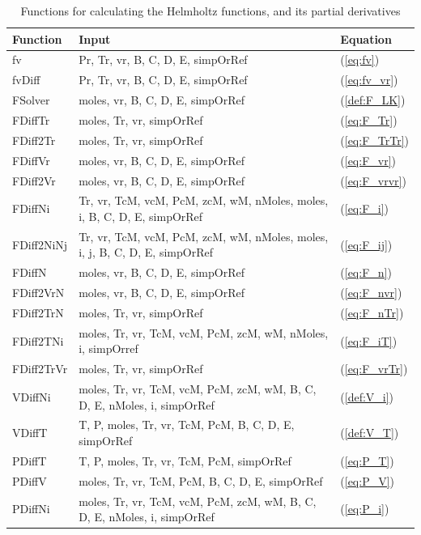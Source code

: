 \documentclass[english]{../thermomemo/thermomemo}
\numberwithin{equation}{section}
\newcommand*{\reff}[1]{(\ref{#1})}
\begin{document}
\begin{table}[t]
\begin{center}
\caption{Functions for calculating the Helmholtz functions, and its partial derivatives}
\label{tab:functionsF}
\begin{tabular}{l p{10cm} l}
\hline%
Function 	& Input   & Equation \\
\hline
fv			& Pr, Tr, vr, B, C, D, E, simpOrRef & \reff{eq:fv} \\
fvDiff		& Pr, Tr, vr, B, C, D, E, simpOrRef & \reff{eq:fv_vr} \\
FSolver		& moles, vr, B, C, D, E, simpOrRef	& \reff{def:F_LK} \\
FDiffTr		& moles, Tr, vr, simpOrRef	& \reff{eq:F_Tr} \\
FDiff2Tr 	& moles, Tr, vr, simpOrRef	& \reff{eq:F_TrTr} \\
FDiffVr		& moles, vr, B, C, D, E, simpOrRef & \reff{eq:F_vr} \\
FDiff2Vr	& moles, vr, B, C, D, E, simpOrRef	& \reff{eq:F_vrvr} \\
FDiffNi		& Tr, vr, TcM, vcM, PcM, zcM, wM, nMoles, moles, i, B, C, D, E, simpOrRef & \reff{eq:F_i} \\
FDiff2NiNj	& Tr, vr, TcM, vcM, PcM, zcM, wM, nMoles, moles, i, j, B, C, D, E, simpOrRef & \reff{eq:F_ij} \\
FDiffN		& moles, vr, B, C, D, E, simpOrRef	& \reff{eq:F_n} \\
FDiff2VrN	& moles, vr, B, C, D, E, simpOrRef	& \reff{eq:F_nvr} \\
FDiff2TrN	& moles, Tr, vr, simpOrRef			& (\ref{eq:F_nTr}) \\

FDiff2TNi	& moles, Tr, vr, TcM, vcM, PcM, zcM, wM, nMoles, i, simpOrref	& \reff{eq:F_iT} \\
FDiff2TrVr	& moles, Tr, vr, simpOrRef	& \reff{eq:F_vrTr} \\
VDiffNi		& moles, Tr, vr, TcM, vcM, PcM, zcM, wM, B, C, D, E, nMoles, i, simpOrRef	& \reff{def:V_i} \\
VDiffT		& T, P, moles, Tr, vr, TcM, PcM, B, C, D, E, simpOrRef	& \reff{def:V_T} \\
PDiffT		& T, P, moles, Tr, vr, TcM, PcM, simpOrRef	& \reff{eq:P_T} \\
PDiffV		& moles, Tr, vr, TcM, PcM, B, C, D, E, simpOrRef	& \reff{eq:P_V} \\
PDiffNi		& moles, Tr, vr, TcM, vcM, PcM, zcM, wM, B, C, D, E, nMoles, i, simpOrRef	& \reff{eq:P_i} \\
\hline
\end{tabular}
\end{center}
\end{table}
\end{document}
